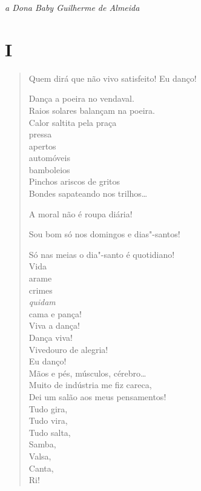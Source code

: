 {\begin{flushright}
\emph{a Dona Baby Guilherme de Almeida}
\end{flushright}

\section*{I}

\begin{verse}
Quem dirá que não vivo satisfeito! Eu danço!

Dança a poeira no vendaval.\\
Raios solares balançam na poeira.\\
Calor saltita pela praça\\
\qquad\qquad\qquad\quad pressa\\
\qquad\qquad\qquad\quad apertos\\
\qquad\qquad\qquad\quad automóveis\\
\qquad\qquad bamboleios\\
\qquad Pinchos ariscos de gritos\\
Bondes sapateando nos trilhos\ldots{}

A moral não é roupa diária!

Sou bom só nos domingos e dias"-santos!

Só nas meias o dia"-santo é quotidiano!\\
\qquad\qquad\qquad\quad Vida\\
\qquad\qquad\qquad\quad arame\\
\qquad\qquad\qquad\quad crimes\\
\qquad\qquad\qquad\quad \emph{quidam}\\
\qquad\qquad\qquad\quad cama e pança!\\
\qquad\qquad Viva a dança!\\
\qquad\qquad Dança viva!\\
\qquad Vivedouro de alegria!\\
Eu danço!\\
Mãos e pés, músculos, cérebro\ldots{}\\
\qquad Muito de indústria me fiz careca,\\
\qquad Dei um salão aos meus pensamentos!\\
\qquad\qquad\qquad\qquad Tudo gira,\\
\qquad\qquad\qquad\qquad Tudo vira,\\
\qquad\qquad\qquad\qquad Tudo salta,\\
\qquad\qquad\qquad\qquad Samba,\\
\qquad\qquad\qquad\qquad Valsa,\\
\qquad\qquad\qquad\qquad Canta,\\
\qquad\qquad\qquad\qquad Ri!


\end{verse}}
